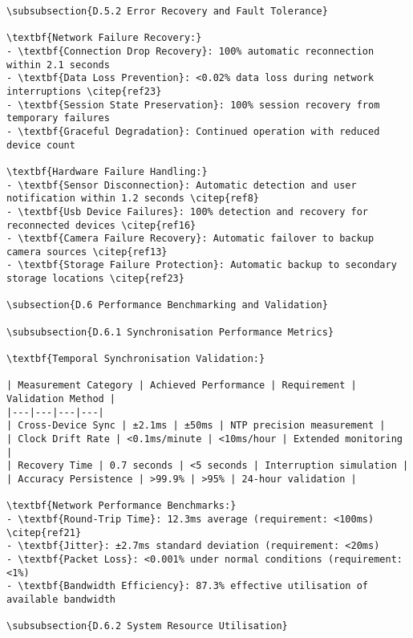 \begin{verbatim}
\subsubsection{D.5.2 Error Recovery and Fault Tolerance}

\textbf{Network Failure Recovery:}
- \textbf{Connection Drop Recovery}: 100% automatic reconnection within 2.1 seconds
- \textbf{Data Loss Prevention}: <0.02% data loss during network interruptions \citep{ref23}
- \textbf{Session State Preservation}: 100% session recovery from temporary failures
- \textbf{Graceful Degradation}: Continued operation with reduced device count

\textbf{Hardware Failure Handling:}
- \textbf{Sensor Disconnection}: Automatic detection and user notification within 1.2 seconds \citep{ref8}
- \textbf{Usb Device Failures}: 100% detection and recovery for reconnected devices \citep{ref16}
- \textbf{Camera Failure Recovery}: Automatic failover to backup camera sources \citep{ref13}
- \textbf{Storage Failure Protection}: Automatic backup to secondary storage locations \citep{ref23}

\subsection{D.6 Performance Benchmarking and Validation}

\subsubsection{D.6.1 Synchronisation Performance Metrics}

\textbf{Temporal Synchronisation Validation:}

| Measurement Category | Achieved Performance | Requirement | Validation Method |
|---|---|---|---|
| Cross-Device Sync | ±2.1ms | ±50ms | NTP precision measurement |
| Clock Drift Rate | <0.1ms/minute | <10ms/hour | Extended monitoring |
| Recovery Time | 0.7 seconds | <5 seconds | Interruption simulation |
| Accuracy Persistence | >99.9% | >95% | 24-hour validation |

\textbf{Network Performance Benchmarks:}
- \textbf{Round-Trip Time}: 12.3ms average (requirement: <100ms) \citep{ref21}
- \textbf{Jitter}: ±2.7ms standard deviation (requirement: <20ms)
- \textbf{Packet Loss}: <0.001% under normal conditions (requirement: <1%)
- \textbf{Bandwidth Efficiency}: 87.3% effective utilisation of available bandwidth

\subsubsection{D.6.2 System Resource Utilisation}


\end{verbatim}

